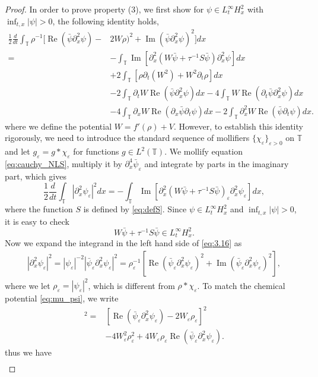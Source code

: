 \documentclass[leqno]{amsart}
\theoremstyle{plain}
\theoremstyle{definition}
\theoremstyle{remark}
\theoremstyle{plain}
\theoremstyle{plain}
\def\T{{\mathbb T}}%
\def\d{{\partial}}
\def\eps{\varepsilon}
\DeclareMathOperator{\RE}{Re}
\DeclareMathOperator{\IM}{Im}
\numberwithin{equation}{section}
\begin{document}
\begin{proof}
In order to prove property (3), we first show for $\psi\in L^\infty_tH^2_x$ with $\inf_{t,x}|\psi|> 0$, the following identity holds, 
\begin{equation}\label{eq:prop_20_1}
\begin{aligned}
\frac12\frac{d}{dt}\int_\T\rho^{-1}[\RE(\bar\psi\d_x^2\psi)-&2W\rho)^2+\IM(\bar\psi\d_x^2\psi)^2]dx\\
=&-\int_\T\IM[\d_x^2(W\bar\psi+\tau^{-1}S\bar\psi)\d_x^2\psi]dx\\
&+2\int_\T [\rho\d_t(W^2)+W^2\d_t \rho ]dx\\
&-2\int_\T \d_tW\RE(\bar\psi\d_x^2\psi)dx-4\int_\T W\RE(\d_t\bar\psi\d_x^2\psi)dx\\
&-4\int_\T \d_x W\RE(\d_x\bar\psi\d_t\psi)dx-2\int_\T \d_x^2W\RE(\bar\psi\d_t\psi)dx.
\end{aligned}
\end{equation}
where we define the potential $W=f'(\rho)+V$. However, to establish this identity rigorously, we need to introduce the standard sequence of mollifiers $\{\chi_\eps\}_{\eps>0}$ on $\T$ and let $g_\eps=g\ast \chi_\eps$ for functions $g\in L^2(\T)$. We mollify equation \eqref{eq:cauchy_NLS}, multiply it by $\d_x^4\bar\psi_\eps$ and integrate by parts in the imaginary part, which gives
\begin{equation}\label{eq:3.16}
\frac12\frac{d}{dt}\int_\T|\d_x^2\psi_\eps|^2dx=-\int_\T\IM[\d_x^2(W\bar\psi+\tau^{-1}S\bar\psi)_\eps\d_x^2\psi_\eps]dx,
\end{equation}
where the function $S$ is defined by \eqref{eq:defS}. Since $\psi\in L^\infty_tH^2_x$ and $\inf_{t,x}|\psi|> 0$, it is easy to check 
\[
W\bar\psi+\tau^{-1}S\bar\psi\in L^\infty_tH^2_x.
\]
Now we expand the integrand in the left hand side of \eqref{eq:3.16} as
\begin{align*}
|\d_x^2\psi_\eps|^2=|\psi_\eps|^{-2}|\bar\psi_\eps\d_x^2\psi_\eps|^2=\rho_\eps^{-1}[\RE(\bar\psi_\eps\d_x^2\psi_\eps)^2+\IM(\bar\psi_\eps\d_x^2\psi_\eps)^2],
\end{align*}
where  we let $\rho_\eps=|\psi_\eps|^2$, which is different from $\rho\ast\chi_\eps$. To match the chemical potential \eqref{eq:mu_psi}, we write
\begin{align*}
[\RE(\bar\psi_\eps\d_x^2\psi_\eps)]^2=&[\RE(\bar\psi_\eps\d_x^2\psi_\eps)-2W_\eps\rho_\eps]^2\\
&-4W_\eps^2\rho_\eps^2+4W_\eps\rho_\eps\RE(\bar\psi_\eps\d_x^2\psi_\eps).
\end{align*}
thus we have
\begin{align*}

\end{align*}
\end{proof}
\end{document}
